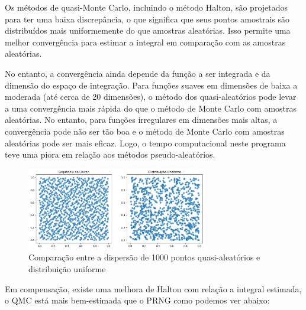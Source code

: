 \documentclass[a4paper]{article}
\begin{document}
 Os métodos de quasi-Monte Carlo, incluindo o método Halton, são projetados para ter uma baixa discrepância, o que significa que seus pontos amostrais são distribuídos mais uniformemente do que amostras aleatórias. Isso permite uma melhor convergência para estimar a integral em comparação com as amostras aleatórias.

No entanto, a convergência ainda depende da função a ser integrada e da dimensão do espaço de integração. Para funções suaves em dimensões de baixa a moderada (até cerca de 20 dimensões), o método dos quasi-aleatórios pode levar a uma convergência mais rápida do que o método de Monte Carlo com amostras aleatórias. No entanto, para funções irregulares em dimensões mais altas, a convergência pode não ser tão boa e o método de Monte Carlo com amostras aleatórias pode ser mais eficaz. Logo, o tempo computacional neste programa teve uma piora em relação aos métodos pseudo-aleatórios.

\begin{figure}[H]
  \centering
  \includegraphics[width=0.7\textwidth]{HxU.png}
  \caption{Comparação entre a dispersão de 1000 pontos quasi-aleatórios e distribuição uniforme}
  \label{fig:HxU}
\end{figure}

Em compensação, existe uma melhora de Halton com relação a integral estimada, o QMC está mais bem-estimada que o PRNG como podemos ver abaixo:
\end{document}
